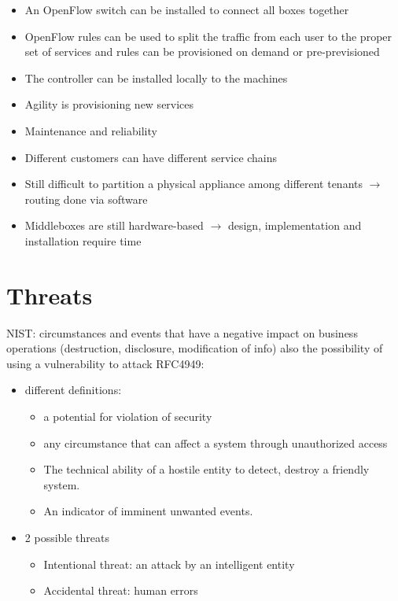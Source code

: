 \documentclass{article}
\begin{document}
\begin{itemize}
\begin{figure}[h]
    \end{figure}
    \begin{itemize}
        \item An OpenFlow switch can be installed to connect all boxes together
        \item OpenFlow rules can be used to split the traffic from each user to the proper set of services and rules can be provisioned on demand or pre-previsioned
        \item The controller can be installed locally to the machines
        \item Agility is provisioning new services
        \item Maintenance and reliability
        \item Different customers can have different service chains
        \item Still difficult to partition a physical appliance among different tenants $\rightarrow$ routing done via software
        \item Middleboxes are still hardware-based $\rightarrow$ design, implementation and installation require time
    \end{itemize}
\end{itemize}


\section{Threats}
NIST: circumstances and events that have a negative impact on business operations (destruction, disclosure, modification of info) also the possibility of using a vulnerability to attack
RFC4949: 
  \begin{itemize}
    \item different definitions: 
      \begin{itemize}
        \item a potential for violation of security
        \item any circumstance that can affect a system through unauthorized access
        \item The technical ability of a hostile entity to detect, destroy a friendly system.
        \item An indicator of imminent unwanted events.
      \end{itemize}
    \item 2 possible threats
      \begin{itemize}
        \item Intentional threat: an attack by an intelligent entity
        \item Accidental threat: human errors
      \end{itemize}
  \end{itemize}
\end{document}
